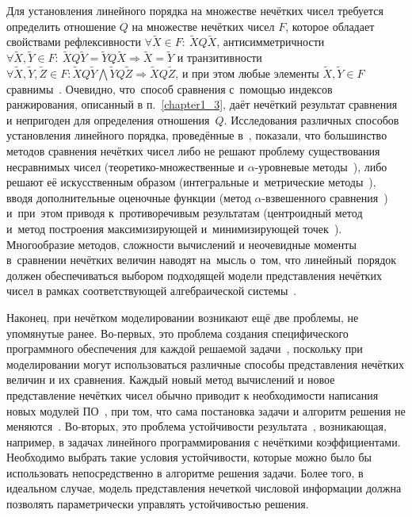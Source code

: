 Для установления линейного порядка на множестве нечётких чисел требуется определить отношение $Q$ на множестве нечётких чисел $F$, которое обладает свойствами рефлексивности $\forall \tilde X \in F:\ \tilde X Q \tilde X$, антисимметричности $\forall \tilde X, \tilde Y \in F:\allowbreak\ \tilde X Q \tilde Y = \tilde Y Q \tilde X \Rightarrow \tilde X = \tilde Y$ и транзитивности $\forall \tilde X, \tilde Y, \tilde Z \in F:\allowbreak \tilde X Q \tilde Y \bigwedge \tilde Y Q \tilde Z \Rightarrow \tilde X Q \tilde Z$, и при этом любые элементы $\tilde X, \tilde Y \in F$ сравнимы~\cite{Vorontsov_Compare}. Очевидно, что~способ сравнения с~помощью индексов ранжирования, описанный в п.~\ref{chapter1_3}, даёт нечёткий результат сравнения и непригоден для определения отношения~$Q$. Исследования различных способов установления линейного порядка, проведённые в~\cite{Vorontsov_Compare}, показали, что большинство методов сравнения нечётких чисел либо не решают проблему существования несравнимых чисел (теоретико-множественные и $\alpha$-уровневые методы~\cite{Cheng_Comparison, Zak}), либо решают её искусственным образом (интегральные и~метрические методы~\cite{Skorokhod, Ledeneva_Nguen}), вводя дополнительные оценочные функции (метод $\alpha$-взвешенного сравнения~\cite{Detyniecki_Yager, Ukhobotov_Comparison, Ledeneva_VSTU_Comparison}) и~при~этом приводя к~противоречивым результатам (центроидный метод~\cite{Centroid} и~метод построения максимизирующей и~минимизирующей точек~\cite{Max_Min_Points}). Многообразие методов, сложности вычислений и неочевидные моменты в~сравнении нечётких величин наводят на~мысль о~том, что линейный~порядок должен обеспечиваться выбором подходящей модели представления нечётких чисел в рамках соответствующей алгебраической системы~\cite{Kosinski}.

Наконец, при нечётком моделировании возникают ещё две проблемы, не упомянутые ранее. Во-первых, это проблема создания специфического программного обеспечения для каждой решаемой задачи~\cite{Uskov_Complex}, поскольку при моделировании могут использоваться различные способы представления нечётких величин и их сравнения. Каждый новый метод вычислений и новое представление нечётких чисел обычно приводит к необходимости написания новых модулей ПО~\cite{Gallyamov}, при том, что сама постановка задачи и алгоритм решения не меняются~\cite{Koroteev_Fuzzy_Arithmetics}. Во-вторых, это проблема устойчивости результата~\cite{Fuller}, возникающая, например, в задачах линейного программирования с нечёткими коэффициентами.  Необходимо выбрать такие условия устойчивости, которые можно было бы использовать непосредственно в алгоритме решения задачи. Более того, в идеальном случае, модель представления нечеткой числовой информации должна позволять параметрически управлять устойчивостью решения.

